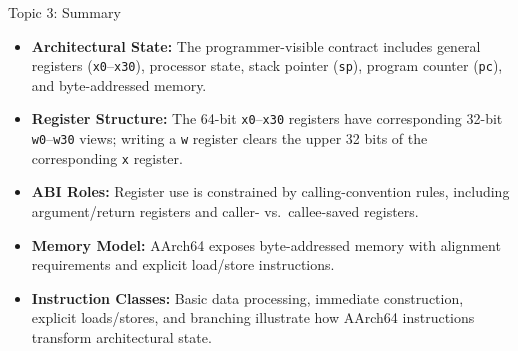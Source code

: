 \documentclass[aspectratio=169,11pt,t,xcolor=table]{beamer}
\newcommand{\key}[1]{\textbf{#1}}
\newcommand{\bits}[1]{\texttt{#1}}
\begin{document}
\begin{frame}{Topic 3: Summary}
\vspace{0.08cm}
\small
\begin{itemize}\setlength{\itemsep}{5pt}
  \item \key{Architectural State:} The programmer-visible contract includes general registers (\bits{x0}--\bits{x30}), processor state, stack pointer (\bits{sp}), program counter (\bits{pc}), and byte-addressed memory.
  \item \key{Register Structure:} The 64-bit \bits{x0}--\bits{x30} registers have corresponding 32-bit \bits{w0}--\bits{w30} views; writing a \bits{w} register clears the upper 32 bits of the corresponding \bits{x} register.
  \item \key{ABI Roles:} Register use is constrained by calling-convention rules, including argument/return registers and caller- vs.\ callee-saved registers.
  \item \key{Memory Model:} AArch64 exposes byte-addressed memory with alignment requirements and explicit load/store instructions.
  \item \key{Instruction Classes:} Basic data processing, immediate construction, explicit loads/stores, and branching illustrate how AArch64 instructions transform architectural state.
\end{itemize}
\vfill
\end{frame}









\end{document}
